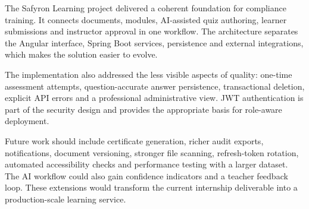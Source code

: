 The Safyron Learning project delivered a coherent foundation for compliance
training. It connects documents, modules, AI-assisted quiz authoring, learner
submissions and instructor approval in one workflow. The architecture separates
the Angular interface, Spring Boot services, persistence and external
integrations, which makes the solution easier to evolve.

The implementation also addressed the less visible aspects of quality:
one-time assessment attempts, question-accurate answer persistence,
transactional deletion, explicit API errors and a professional administrative
view. JWT authentication is part of the security design and provides the
appropriate basis for role-aware deployment.

Future work should include certificate generation, richer audit exports,
notifications, document versioning, stronger file scanning, refresh-token
rotation, automated accessibility checks and performance testing with a
larger dataset. The AI workflow could also gain confidence indicators and a
teacher feedback loop. These extensions would transform the current
internship deliverable into a production-scale learning service.
